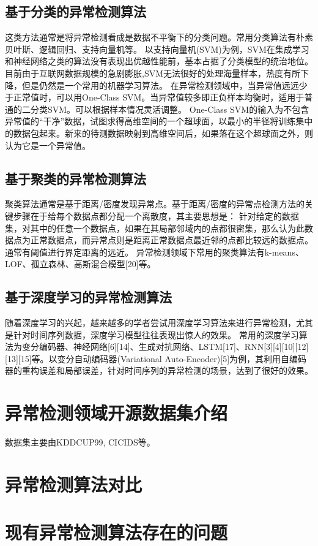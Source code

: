 \subsection{基于分类的异常检测算法}
这类方法通常是将异常检测看成是数据不平衡下的分类问题。常用分类算法有朴素贝叶斯、逻辑回归、支持向量机等。
以支持向量机(SVM)为例，SVM在集成学习和神经网络之类的算法没有表现出优越性能前，基本占据了分类模型的统治地位。
目前由于互联网数据规模的急剧膨胀,SVM无法很好的处理海量样本，热度有所下降，但是仍然是一个常用的机器学习算法。
在异常检测领域中，当异常值远远少于正常值时，可以用One-Class SVM。当异常值较多即正负样本均衡时，适用于普通的二分类SVM。可以根据样本情况灵活调整。
One-Class SVM的输入为不包含异常值的“干净”数据，试图求得高维空间的一个超球面，以最小的半径将训练集中的数据包起来。新来的待测数据映射到高维空间后，如果落在这个超球面之外，则认为它是一个异常值。

\subsection{基于聚类的异常检测算法}

聚类算法通常是基于距离/密度发现异常点。基于距离/密度的异常点检测方法的关键步骤在于给每个数据点都分配一个离散度，其主要思想是：
针对给定的数据集，对其中的任意一个数据点，如果在其局部邻域内的点都很密集，那么认为此数据点为正常数据点，而异常点则是距离正常数据点最近邻的点都比较远的数据点。通常有阈值进行界定距离的远近。
异常检测领域下常用的聚类算法有k-means、LOF、孤立森林、高斯混合模型[20]等。

\subsection{基于深度学习的异常检测算法}
随着深度学习的兴起，越来越多的学者尝试用深度学习算法来进行异常检测，尤其是针对时间序列数据，深度学习模型往往表现出惊人的效果。
常用的深度学习算法为变分编码器、神经网络[6][14]、生成对抗网络、LSTM[17]、RNN[3][4][10][12][13][15]等。以变分自动编码器(Variational Auto-Encoder)[5]为例，其利用自编码器的重构误差和局部误差，针对时间序列的异常检测的场景，达到了很好的效果。

\section{异常检测领域开源数据集介绍}
数据集主要由KDDCUP99, CICIDS等。
\section{异常检测算法对比}

\section{现有异常检测算法存在的问题}